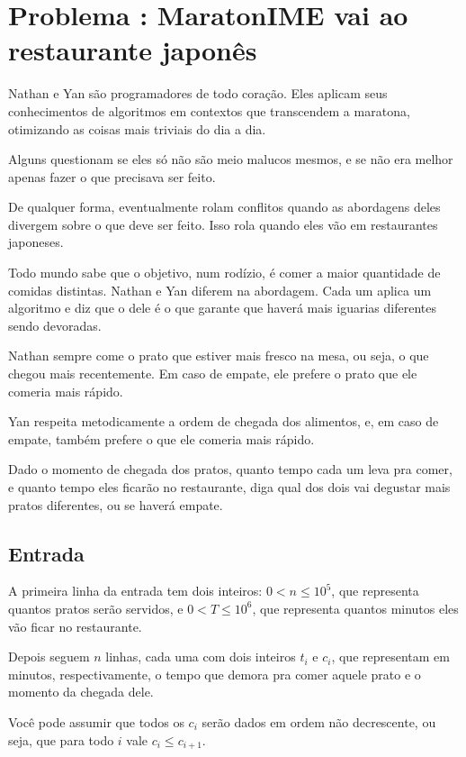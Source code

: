 \section*{Problema \proxLetra: MaratonIME vai ao restaurante japonês}

Nathan e Yan são programadores de todo coração. Eles aplicam seus
conhecimentos de algoritmos em contextos que transcendem a maratona,
otimizando as coisas mais triviais do dia a dia.

Alguns questionam se eles só não são meio malucos mesmos, e se não 
era melhor apenas fazer o que precisava ser feito.

De qualquer forma, eventualmente rolam conflitos quando as abordagens
deles divergem sobre o que deve ser feito. Isso rola quando eles vão
em restaurantes japoneses.

Todo mundo sabe que o objetivo, num rodízio, é comer a maior quantidade
de comidas distintas. Nathan e Yan diferem na abordagem. Cada um aplica
um algoritmo e diz que o dele é o que garante que haverá mais iguarias
diferentes sendo devoradas.

Nathan sempre come o prato que estiver mais fresco na mesa, ou seja,
o que chegou mais recentemente. Em caso de empate, ele prefere o prato
que ele comeria mais rápido.

Yan respeita metodicamente a ordem de chegada dos alimentos, e, em
caso de empate, também prefere o que ele comeria mais rápido.

Dado o momento de chegada dos pratos, quanto tempo cada um leva pra comer,
e quanto tempo eles ficarão no restaurante, diga qual dos dois vai degustar
mais pratos diferentes, ou se haverá empate.
\subsection*{Entrada}

A primeira linha da entrada tem dois inteiros: $0 < n \leq 10^5$, que representa
quantos pratos serão servidos, e $0 < T \leq 10^6$, que representa quantos
minutos eles vão ficar no restaurante.

Depois seguem $n$ linhas, cada uma com dois inteiros $t_i$ e $c_i$, que
representam em minutos, respectivamente, o tempo que demora pra comer 
aquele prato e o momento da chegada dele.

Você pode assumir que todos os $c_i$ serão dados em ordem não decrescente, ou
seja, que para todo $i$ vale $c_i \leq c_{i+1}$.

